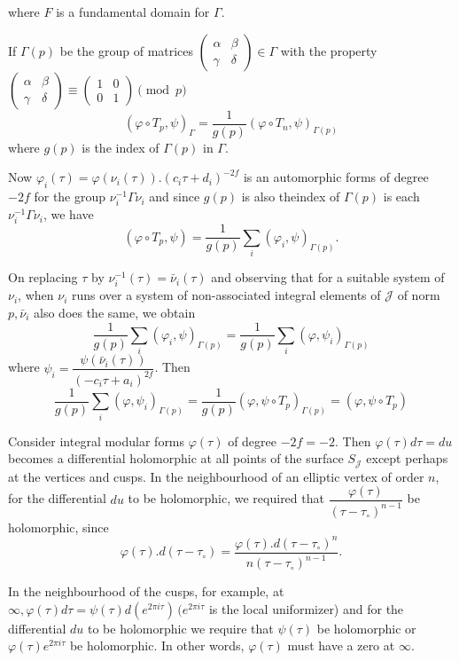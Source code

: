 where $F$ is a fundamental domain for $\Gamma$.

If $\Gamma (p)$ be the group of matrices $\begin{pmatrix}\alpha &\beta
  \\ \gamma &\delta \end{pmatrix} \in \Gamma $ with the property
$\begin{pmatrix}\alpha &\beta \\ \gamma
  &\delta \end{pmatrix}\equiv \begin{pmatrix} 1&0\\0&1 \end{pmatrix}
\pmod p$ 
$$
(\varphi \circ T_p,\psi)_ \Gamma =\frac{1}{g(p)}(\varphi \circ
T_n,\psi)_{\Gamma(p)} 
$$
where $g(p)$ is the index of $\Gamma(p)$ in $\Gamma$.

Now $\varphi_i (\tau)=\varphi(\nu_i(\tau)).(c_i \tau+d_i)^{-2f}$ is an
automorphic forms of degree $-2f$ for the group $\nu^{-1}_i \Gamma
\nu_i$ and since $g(p)$ is also the\pageoriginale index of $\Gamma(p)$ is each
$\nu^{-1}_i \Gamma \nu_i$, we have 
$$
(\varphi \circ T_p,\psi)= \frac{1}{g(p)}\sum_i (\varphi_i, \psi)_{\Gamma (p)}.
$$

On replacing $\tau$ by $\nu^{-1}_i (\tau)=\bar{\nu}_i (\tau)$ and
observing that for a suitable system of $\nu_i$, when $\nu_i$ runs
over a system of non-associated integral elements of $\mathcal{J}$ of
norm $p,\bar {\nu}_i$ also does the same, we obtain 
$$
\frac{1}{g(p)}\sum_i (\varphi_i,\psi)_{\Gamma(p)}=\frac{1}{g(p)}\sum_i
(\varphi,\psi_i)_{\Gamma(p)} 
$$
where $\psi_i=\dfrac{\psi (\bar{\nu}_i(\tau))}{(-c_i\tau
  +a_i)^{2f}}$. Then 
$$
\frac{1}{g(p)}\sum_i (\varphi,\psi_i)_{\Gamma(p)}=\frac{1}{g(p)}
(\varphi,\psi \circ T_p)_{\Gamma(p)}=(\varphi,\psi \circ T_p) 
$$

Consider integral modular forms $\varphi(\tau)$ of degree
$-2f=-2$. Then $\varphi(\tau)d \tau=du$ becomes a differential
holomorphic at all points of the surface $S_\mathcal{J}$ except
perhaps at the vertices and cusps. In the neighbourhood of an elliptic
vertex of order $n$, for the differential $du$ to be holomorphic, we
required that $\dfrac{\varphi(\tau)}{(\tau-\tau_ \circ)^{n-1}}$ be
holomorphic, since 
$$
\varphi (\tau). d(\tau-\tau_\circ)=\frac{\varphi(\tau).d (\tau-\tau_
  \circ)^n}{n(\tau-\tau _ \circ)^{n-1}}. 
$$

In the neighbourhood of the cusps, for example, at $\infty, \varphi
(\tau)d \tau=\psi (\tau)d(e^{2\pi i \tau})\,(e^{2\pi i \tau}$ is the
local uniformizer) and for the differential $du$ to be holomorphic we
require that $\psi(\tau)$ be holomorphic or $\varphi(\tau)e^{2\pi i
  \tau}$ be holomorphic. In other words, $\varphi(\tau)$ must have a
zero at $\infty$. 

